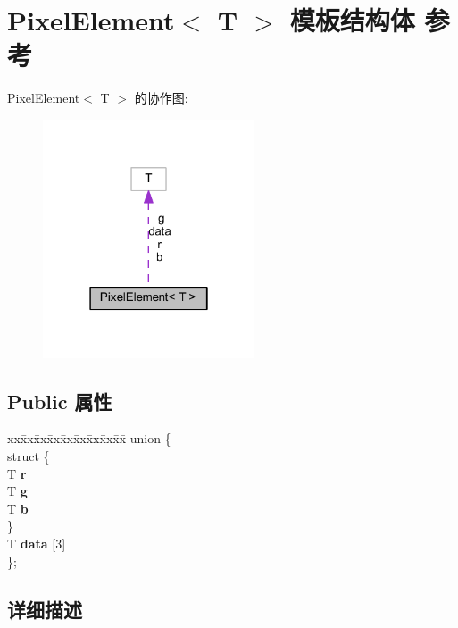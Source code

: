 \section{Pixel\-Element$<$ T $>$ 模板结构体 参考}
\label{struct_pixel_element}


Pixel\-Element$<$ T $>$ 的协作图\-:\nopagebreak
\begin{figure}[H]
\begin{center}
\leavevmode
\includegraphics[width=178pt]{struct_pixel_element__coll__graph}
\end{center}
\end{figure}
\subsection*{Public 属性}
\begin{DoxyCompactItemize}
\item 
\begin{tabbing}
xx\=xx\=xx\=xx\=xx\=xx\=xx\=xx\=xx\=\kill
union \{\\
\>struct \{\\
\>\>T {\bfseries r}\\
\>\>T {\bfseries g}\\
\>\>T {\bfseries b}\\
\>\} \label{union_pixel_element_1_1@0_acb0a52d4faf6fe843e22eaec64e2d488}
\\
\>T {\bfseries data} [3]\\
\}; \label{struct_pixel_element_a1472a92dc3ce2319853f75bec0ac742f}
\\

\end{tabbing}\end{DoxyCompactItemize}


\subsection{详细描述}
